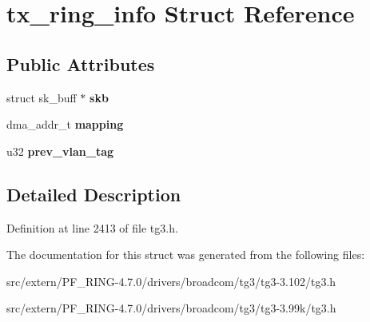 \hypertarget{structtx__ring__info}{
\section{tx\_\-ring\_\-info Struct Reference}
\label{structtx__ring__info}
}
\subsection*{Public Attributes}
\begin{DoxyCompactItemize}
\item 
\hypertarget{structtx__ring__info_a4485810409348c50eca0e460b2ece034}{
struct sk\_\-buff $\ast$ {\bfseries skb}}
\label{structtx__ring__info_a4485810409348c50eca0e460b2ece034}

\item 
\hypertarget{structtx__ring__info_acfba193a16637ba15de373d96a4694c0}{
dma\_\-addr\_\-t {\bfseries mapping}}
\label{structtx__ring__info_acfba193a16637ba15de373d96a4694c0}

\item 
\hypertarget{structtx__ring__info_a48a015b8aa5dfeaaac1bb47f6e7bdde3}{
u32 {\bfseries prev\_\-vlan\_\-tag}}
\label{structtx__ring__info_a48a015b8aa5dfeaaac1bb47f6e7bdde3}

\end{DoxyCompactItemize}


\subsection{Detailed Description}


Definition at line 2413 of file tg3.h.



The documentation for this struct was generated from the following files:\begin{DoxyCompactItemize}
\item 
src/extern/PF\_\-RING-\/4.7.0/drivers/broadcom/tg3/tg3-\/3.102/tg3.h\item 
src/extern/PF\_\-RING-\/4.7.0/drivers/broadcom/tg3/tg3-\/3.99k/tg3.h\end{DoxyCompactItemize}
